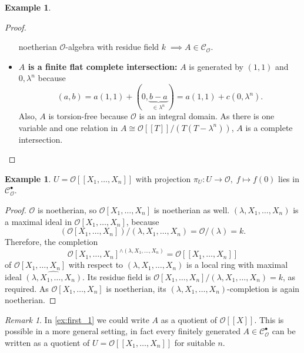 \documentclass{article}
\theoremstyle{plain}%
\theoremstyle{definition}
\newtheorem{example}[theorem]{Example}
\theoremstyle{remark}
\newtheorem{remark}[theorem]{Remark}
\newcommand{\cob}{\mathcal{C}_\mathcal{O}^\bullet}
\newcommand{\co}{\mathcal{C}_\mathcal{O}}
\begin{document}
\begin{example}
\begin{proof}
\begin{itemize}
                noetherian \(\mathcal{O}\)-algebra with residue field \(k\; \implies A \in \co\). 
            \item \textbf{\(A\) is a finite flat complete intersection:}
                \(A\) is generated by \((1,1)\) and \(0, \lambda^n\) because
                \[
                    (a,b) = a(1,1) + (0, \underbrace{b-a}_{\in \lambda^n}) = a(1,1) + c(0, \lambda^n).
                \]
                Also, \(A\) is torsion-free because \(\mathcal{O}\) is an integral domain. 
                As there is one variable and one relation in \(A \cong \mathcal{O}[[T]]/(T(T-\lambda^n))\),
                \(A\) is a complete intersection.
        \end{itemize}
    \end{proof}
\end{example}


\begin{example}\label{ex:last_1}\cite[cf.][example 5]{Darmon1995}
    \(U = \mathcal{O}[[X_1, \dots, X_n]]\) with projection \(\pi_U\colon U \to \mathcal{O},\; f \mapsto f(0)\) lies in \(\cob\).
    \begin{proof}
        \(\mathcal{O}\) is noetherian, so \(\mathcal{O}[X_1, \dots, X_{n}]\) is noetherian as well.
        \((\lambda, X_1, \dots, X_n)\) is a maximal ideal in \(\mathcal{O}[X_1, \dots, X_n]\), because
        \[\left(\mathcal{O}[X_1, \dots, X_n]\right)/(\lambda, X_1, \dots, X_n) = \mathcal{O}/(\lambda) = k.\]
        Therefore, the completion \[\mathcal{O}[X_1, \dots, X_n]^{\wedge(\lambda, X_1, \dots, X_n)} = \mathcal{O}[[X_1, \dots, X_n]]\]
        of \(\mathcal{O}[X_1, \dots, X_n]\) with respect to \((\lambda, X_1, \dots, X_n)\) is a local ring with maximal ideal
        \(\widehat{(\lambda, X_1, \dots, X_n)}\).
        Its residue field is \(\mathcal{O}[X_1, \dots, X_n]/(\lambda, X_1, \dots, X_n) = k\), as required.
        As \(\mathcal{O}[X_1, \dots, X_n]\) is noetherian, its \((\lambda, X_1, \dots, X_n)\)-completion is again noetherian.
    \end{proof}
\end{example}

\begin{remark}\label{rem:quotientofU}
    In \cref{ex:first_1} we could write \(A\) as a quotient of \(\mathcal{O}[[X]]\). 
    This is possible in a more general setting, in fact every finitely generated \(A \in \cob\) 
    can be written as a quotient of
    \(U = \mathcal{O}[[X_1, \dots, X_n]]\) for suitable \(n\).
\end{remark}
\end{document}
